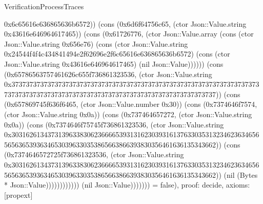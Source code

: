 \begin{lexlean}{VerificationProcessTraces}
\begin{semanticmodule}
{0x6c65616e636865636b6572)) (cons (0x6d6f64756c65, (ctor Json::Value.string 0x43616e646964617465)) (cons (0x61726776, (ctor Json::Value.array (cons (ctor Json::Value.string 0x656e76) (cons (ctor Json::Value.string 0x24544f4f4c434841494e2f62696e2f6c65616e636865636b6572) (cons (ctor Json::Value.string 0x43616e646964617465) (nil Json::Value)))))) (cons (0x65786563757461626c655f736861323536, (ctor Json::Value.string 0x37373737373737373737373737373737373737373737373737373737373737373737373737373737373737373737373737373737373737373737373737373737)) (cons (0x657869745f636f6465, (ctor Json::Value.number 0x30)) (cons (0x7374646f7574, (ctor Json::Value.string 0x0a)) (cons (0x737464657272, (ctor Json::Value.string 0x0a)) (cons (0x7374646f75745f736861323536, (ctor Json::Value.string 0x30316261343731396338306236666539313162303931613763303531323462363465656563653936346530396330353865663866393830356461636135343662)) (cons (0x7374646572725f736861323536, (ctor Json::Value.string 0x30316261343731396338306236666539313162303931613763303531323462363465656563653936346530396330353865663866393830356461636135343662)) (nil (Bytes * Json::Value)))))))))))) (nil Json::Value))))))) = false),
  proof: decide{},
  axioms: [propext]
}


\end{semanticmodule}
\end{lexlean}
